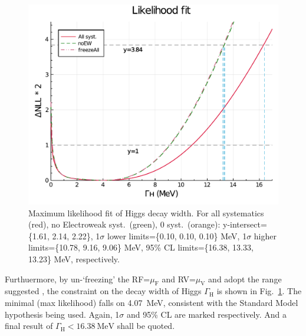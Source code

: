 \begin{figure}[h]
    \centering
    \includegraphics[width=.8\linewidth]{fig/Final_fit_width.pdf}
    \caption{Maximum likelihood fit of Higgs decay width. For all systematics (red), no Electroweak syst.~(green),
    0 syst.~(orange): y-intersect=\{1.61, 2.14, 2.22\}, 1$\sigma$ lower limits=\{0.10, 0.10, 0.10\} MeV,
1$\sigma$ higher limits=\{10.78, 9.16, 9.06\} MeV, 95\% CL limits=\{16.38, 13.33, 13.23\} MeV, respectively.}
\label{fig:final_fit_width}
\end{figure}
Furthuermore, by un-`freezing' the RF=$\mu_\mathrm{F}$ and RV=$\mu_\mathrm{V}$ and adopt the range suggested
\cite{rfrv_higgs_pas}, the constraint on the decay width of Higgs $\Gamma_\mathrm{H}$ is shown in 
Fig.~\ref{fig:final_fit_width}. The minimal (max likelihood) falls on \SI{4.07}{\mega\electronvolt},
consistent with the Standard Model hypothesis being used. 
Again, 1$\sigma$ and 95\% CL are marked respectively. And a final result of 
$\Gamma_\mathrm{H}<\SI{16.38}{\mega\electronvolt}$ shall be quoted.




